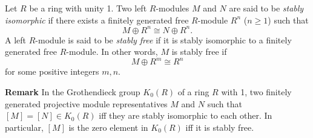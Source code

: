 \documentclass[12pt]{article}
\begin{document}
Let $R$ be a ring with unity 1.  Two left $R$-modules $M$ and $N$
are said to be \emph{stably isomorphic} if there exists a finitely
generated free $R$-module $R^n$ ($n\geq1$) such that $$M\oplus
R^n\cong N\oplus R^n.$$  A left $R$-module is said to be
\emph{stably free} if it is stably isomorphic to a finitely
generated free $R$-module.  In other words, $M$ is stably free if
$$M\oplus R^m\cong R^n$$ for some positive integers $m,n$.

\textbf{Remark} In the Grothendieck group $K_0(R)$ of a ring $R$
with 1, two finitely generated projective module representatives $M$
and $N$ such that $[M]=[N]\in K_0(R)$ iff they are stably isomorphic
to each other.  In particular, $[M]$ is the zero element in $K_0(R)$
iff it is stably free.
\end{document}
